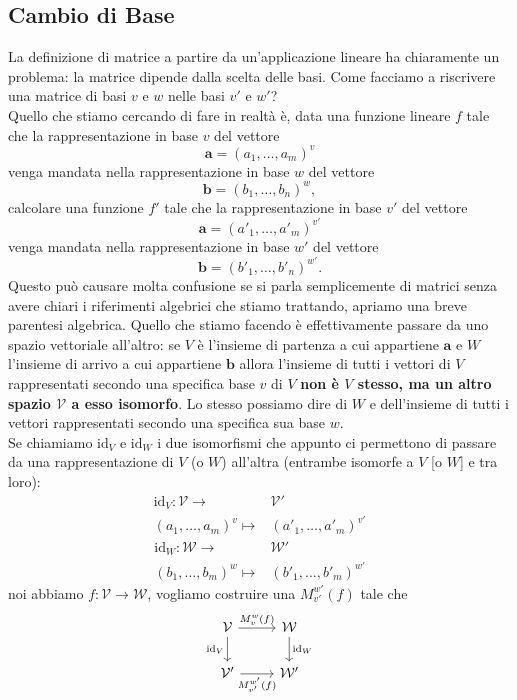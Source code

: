\documentclass[11pt]{scrartcl}
\begin{document}
  	 \subsection{Cambio di Base}
  	 La definizione di matrice a partire da un'applicazione lineare ha chiaramente un problema: la matrice dipende dalla scelta delle basi. Come facciamo a riscrivere una matrice di basi $v$ e $w$ nelle basi $v'$ e $w'$? \\
  	 Quello che stiamo cercando di fare in realtà è, data una funzione lineare $f$ tale che la rappresentazione in base $v$ del vettore
  	 $$\mathbf{a}=(a_1,\dots,a_m)^v$$
  	 venga mandata nella rappresentazione in base $w$ del vettore $$\mathbf{b}=(b_1,\dots,b_n)^w,$$
  	 calcolare una funzione $f'$ tale che la rappresentazione in base $v'$ del vettore 
  	 $$\mathbf{a}=(a'_1,\dots,a'_m)^{v'}$$
  	 venga mandata nella rappresentazione in base $w'$ del vettore $$\mathbf{b}=(b'_1,\dots,b'_n)^{w'}.$$
  	 Questo può causare molta confusione se si parla semplicemente di matrici senza avere chiari i riferimenti algebrici che stiamo trattando, apriamo una breve parentesi algebrica. Quello che stiamo facendo è effettivamente passare da uno spazio vettoriale all'altro: se $V$ è l'insieme di partenza a cui appartiene $\mathbf{a}$ e $W$ l'insieme di arrivo a cui appartiene $\mathbf{b}$ allora l'insieme di tutti i vettori di $V$ rappresentati secondo una specifica base $v$ di $V$ \textbf{non è $V$ stesso, ma un altro spazio $\mathcal{V}$ a esso isomorfo}. Lo stesso possiamo dire di $W$ e dell'insieme di tutti i vettori rappresentati secondo una specifica sua base $w$. \\
  	 Se chiamiamo $\text{id}_V$ e $\text{id}_W$ i due isomorfismi che appunto ci permettono di passare da una rappresentazione di $V$ (o $W$) all'altra (entrambe isomorfe a $V$ [o $W$] e tra loro):
  	 \begin{align*}
  	 	\text{id}_V:\mathcal{V}\to & \mathcal{V'} \\
  	 	(a_1,\dots,a_m)^v\mapsto & (a'_1,\dots,a'_m)^{v'}
  	 \end{align*}
  	 \begin{align*}
  	 	\text{id}_W:\mathcal{W}\to & \mathcal{W'} \\
  	 	(b_1,\dots,b_m)^w\mapsto & (b'_1,\dots,b'_m)^{w'}
  	 \end{align*}
  	 noi abbiamo $f:\mathcal{V}\to \mathcal{W}$, vogliamo costruire una $M_{v'}^{w'}(f)$ tale che 
  	 $$
  	 \begin{tikzcd}
  	 	\mathcal{V} \arrow{r}{M_v^w(f)} \arrow[d,swap,"\text{id}_V"] & \mathcal{W} \arrow[d,"\text{id}_W"] \\
  	 	\mathcal{V'} \arrow[r,swap,"M_{v'}^{w'}(f)"] &  \mathcal{W'}
  	 \end{tikzcd}
  	 $$
\end{document}

